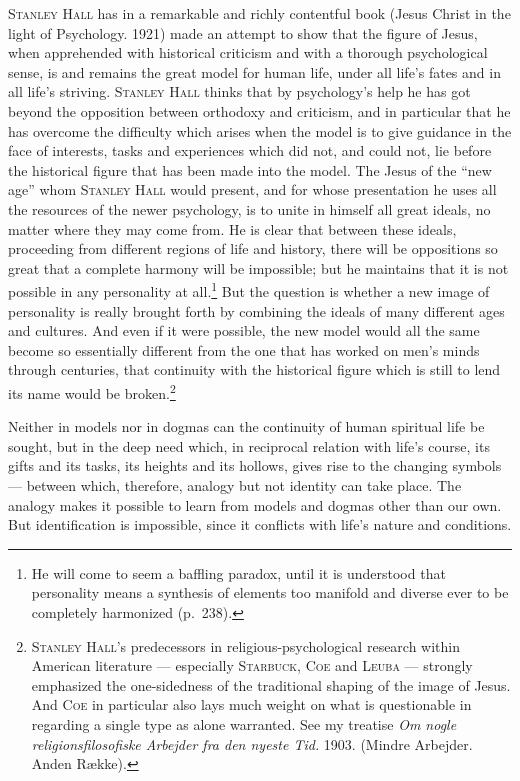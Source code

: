\documentclass[12pt]{book}
\newcommand{\opage}[1]{\marginnote{\footnotesize\textit{[#1]}}}
\begin{document}
\textsc{Stanley Hall} has in a remarkable and richly contentful book (Jesus Christ
in the light of Psychology. 1921) made an attempt to show that the figure of Jesus,
when apprehended with historical criticism and with a thorough psychological sense,
is and remains the great model for human life, under all life's fates and in all
life's striving. \textsc{Stanley Hall} thinks that by psychology's help he has got
beyond the opposition between orthodoxy and criticism, and in particular that he has
overcome the difficulty which arises when the model is to give guidance in the face
of interests, tasks and experiences which did not, and could not, lie before the
historical figure that has been made into the model. The Jesus of the ``new age''
whom \textsc{Stanley Hall} would present, and for whose presentation he uses all the
resources of the newer psychology, is to unite in himself all great ideals, no
matter where they may come from. He is clear that between these ideals, proceeding
from different regions of life and history, there will be oppositions so great that
a complete harmony will be impossible; but he maintains that it is not possible in
any personality at all.\footnote{He will come to seem a baffling paradox, until it
is understood that personality means a synthesis of elements too manifold and
diverse ever to be completely harmonized (p.\ 238).} But the question is whether a
new \opage{136}image of personality is really brought forth by combining the ideals of many
different ages and cultures. And even if it were possible, the new model would all
the same become so essentially different from the one that has worked on men's minds
through centuries, that continuity with the historical figure which is still to lend
its name would be broken.\footnote{\textsc{Stanley Hall}'s predecessors in
religious-psychological research within American literature --- especially
\textsc{Starbuck, Coe} and \textsc{Leuba} --- strongly emphasized the one-sidedness
of the traditional shaping of the image of Jesus. And \textsc{Coe} in particular also
lays much weight on what is questionable in regarding a single type as alone
warranted. See my treatise \textit{Om nogle religionsfilosofiske Arbejder fra den
nyeste Tid.} 1903. (Mindre Arbejder. Anden Række).}

Neither in models nor in dogmas can the continuity of human spiritual life be
sought, but in the deep need which, in reciprocal relation with life's course, its
gifts and its tasks, its heights and its hollows, gives rise to the changing symbols
--- between which, therefore, analogy but not identity can take place. The analogy
makes it possible to learn from models and dogmas other than our own. But
identification is impossible, since it conflicts with life's nature and conditions.
\end{document}
